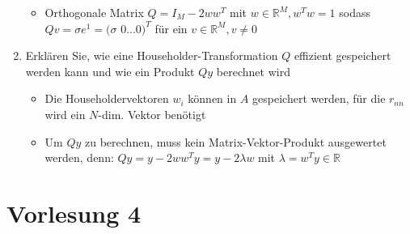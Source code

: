 \documentclass[]{article}
\newcommand*{\real}{\ensuremath{\mathbb{R}}}
\begin{document}
\begin{enumerate}
\begin{itemize}
				\item Orthogonale Matrix $Q = I_M - 2w w^T$ mit $w \in \mathbb{R}^M, w^T w = 1$ sodass $Qv = \sigma e^1 = (\sigma$ $0 \dots 0)^T$ für ein $v \in \mathbb{R}^M, v \neq 0$
			\end{itemize}
		\item Erklären Sie, wie eine Householder-Transformation $Q$ effizient gespeichert werden kann und wie ein Produkt $Qy$ berechnet wird
			\begin{itemize}
				\item Die Householdervektoren $w_i$ können in $A$ gespeichert werden, für die $r_{nn}$ wird ein $N$-dim. Vektor benötigt
                \item Um $Qy$ zu berechnen, muss kein Matrix-Vektor-Produkt ausgewertet werden, denn:
                $Qy = y - 2ww^Ty = y - 2\lambda w$ mit $\lambda = w^Ty \in \real$
			\end{itemize}
	\end{enumerate}

\section{Vorlesung 4}
\end{document}
